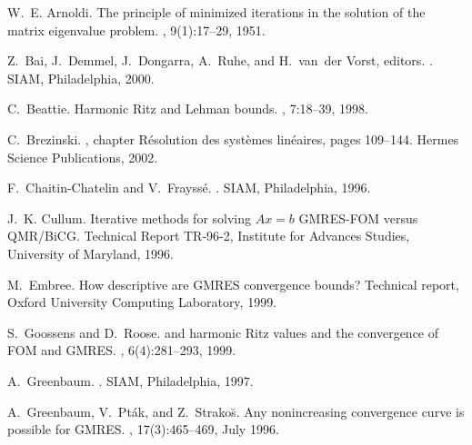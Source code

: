 

\begin{thebibliography}{100}
	
     W.~E. Arnoldi. \newblock The principle of minimized iterations in the solution of the
    matrix
  eigenvalue problem.
, 9(1):17--29, 1951.


	 Z.~Bai, J.~Demmel, J.~Dongarra, A.~Ruhe, and H.~van~der Vorst, editors.
	.
	\newblock SIAM, Philadelphia, 2000.


	 C.~Beattie. \newblock Harmonic {R}itz and {L}ehman bounds. ,
	7:18--39, 1998.

	 C.~Brezinski. ,
    chapter
  Résolution des systèmes linéaires, pages 109--144.
\newblock Hermes Science Publications, 2002.

 F.~{Chaitin-Chatelin} and V.~Frayssé. . \newblock SIAM, Philadelphia, 1996.



	 J.~K. Cullum. \newblock Iterative methods for solving ${A}x=b$ {GMRES-FOM} versus
	{QMR/BiCG}. \newblock Technical Report TR-96-2, Institute for Advances Studies, University
	of Maryland, 1996.
	
	 M.~Embree. \newblock How descriptive are {GMRES} convergence bounds? \newblock Technical
report, Oxford University Computing Laboratory, 1999.

	 S.~Goossens and D.~Roose.  and harmonic {Ritz} values and the
	convergence of {FOM} and
	{GMRES}.
	, 6(4):281--293,
	1999.
	
	 A.~Greenbaum. .
    \newblock SIAM, Philadelphia, 1997.
	
	
	 A.~Greenbaum, V.~Pták, and Z.~Strako{\u{s}}. \newblock Any nonincreasing
	convergence curve is possible for {GMRES}. ,
	17(3):465--469, July 1996.
	


\end{thebibliography}
